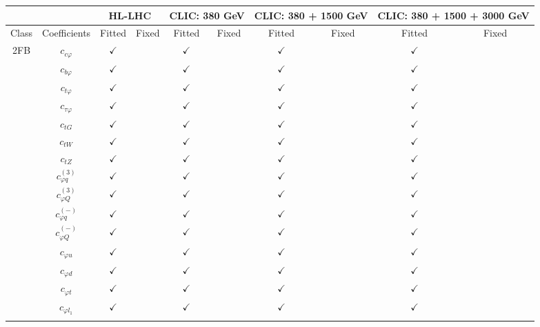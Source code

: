 \documentclass{article}
\begin{document}
\begin{table}[H]
\centering
\begin{tabular}{|c|c|c|c|c|c|c|c|c|c|}
\hline
 &  & \multicolumn{2}{c|}{HL-LHC} & \multicolumn{2}{c|}{CLIC: 380 GeV} & \multicolumn{2}{c|}{CLIC: 380 + 1500 GeV} & \multicolumn{2}{c|}{CLIC: 380 + 1500 + 3000 GeV} \\ \hline
Class & Coefficients & Fitted & Fixed  & Fitted & Fixed  & Fitted & Fixed  & Fitted & Fixed  \\ \hline
\multirow{23}{*}{2FB}
 & $c_{c \varphi}$ & $\checkmark$ &  & $\checkmark$ &  & $\checkmark$ &  & $\checkmark$ & \\ \cline{2-10}
 & $c_{b \varphi}$ & $\checkmark$ &  & $\checkmark$ &  & $\checkmark$ &  & $\checkmark$ & \\ \cline{2-10}
 & $c_{t \varphi}$ & $\checkmark$ &  & $\checkmark$ &  & $\checkmark$ &  & $\checkmark$ & \\ \cline{2-10}
 & $c_{\tau \varphi}$ & $\checkmark$ &  & $\checkmark$ &  & $\checkmark$ &  & $\checkmark$ & \\ \cline{2-10}
 & $c_{tG}$ & $\checkmark$ &  & $\checkmark$ &  & $\checkmark$ &  & $\checkmark$ & \\ \cline{2-10}
 & $c_{tW}$ & $\checkmark$ &  & $\checkmark$ &  & $\checkmark$ &  & $\checkmark$ & \\ \cline{2-10}
 & $c_{tZ}$ & $\checkmark$ &  & $\checkmark$ &  & $\checkmark$ &  & $\checkmark$ & \\ \cline{2-10}
 & $c_{\varphi q}^{(3)}$ & $\checkmark$ &  & $\checkmark$ &  & $\checkmark$ &  & $\checkmark$ & \\ \cline{2-10}
 & $c_{\varphi Q}^{(3)}$ & $\checkmark$ &  & $\checkmark$ &  & $\checkmark$ &  & $\checkmark$ & \\ \cline{2-10}
 & $c_{\varphi q}^{(-)}$ & $\checkmark$ &  & $\checkmark$ &  & $\checkmark$ &  & $\checkmark$ & \\ \cline{2-10}
 & $c_{\varphi Q}^{(-)}$ & $\checkmark$ &  & $\checkmark$ &  & $\checkmark$ &  & $\checkmark$ & \\ \cline{2-10}
 & $c_{\varphi u}$ & $\checkmark$ &  & $\checkmark$ &  & $\checkmark$ &  & $\checkmark$ & \\ \cline{2-10}
 & $c_{\varphi d}$ & $\checkmark$ &  & $\checkmark$ &  & $\checkmark$ &  & $\checkmark$ & \\ \cline{2-10}
 & $c_{\varphi t}$ & $\checkmark$ &  & $\checkmark$ &  & $\checkmark$ &  & $\checkmark$ & \\ \cline{2-10}
 & $c_{\varphi l_1}$ & $\checkmark$ &  & $\checkmark$ &  & $\checkmark$ &  & $\checkmark$ & \\ \cline{2-10}

\end{tabular}
\end{table}
\end{document}
